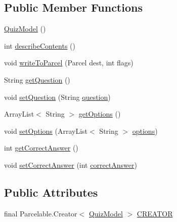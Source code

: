 \subsection*{Public Member Functions}
\begin{DoxyCompactItemize}
\item 
\hyperlink{classorg_1_1buildmlearn_1_1quiztime_1_1data_1_1QuizModel_a6edd6fc87ecca733758244af765476c4}{Quiz\+Model} ()
\item 
int \hyperlink{classorg_1_1buildmlearn_1_1quiztime_1_1data_1_1QuizModel_a096de5851958330cbb3ad03fe7a5cc18}{describe\+Contents} ()
\item 
void \hyperlink{classorg_1_1buildmlearn_1_1quiztime_1_1data_1_1QuizModel_ad6382aa8376dbde55531e6a0a274eb74}{write\+To\+Parcel} (Parcel dest, int flags)
\item 
String \hyperlink{classorg_1_1buildmlearn_1_1quiztime_1_1data_1_1QuizModel_abba335db2d409549f41d10bbd05a8bab}{get\+Question} ()
\item 
void \hyperlink{classorg_1_1buildmlearn_1_1quiztime_1_1data_1_1QuizModel_a07aefd1723f5bf604fc024e9b2983e45}{set\+Question} (String \hyperlink{classorg_1_1buildmlearn_1_1quiztime_1_1data_1_1QuizModel_a766d7c74280ac9f78f0ef37b81a98992}{question})
\item 
Array\+List$<$ String $>$ \hyperlink{classorg_1_1buildmlearn_1_1quiztime_1_1data_1_1QuizModel_ae4dad0dfeb2020e9f8827542fd625c07}{get\+Options} ()
\item 
void \hyperlink{classorg_1_1buildmlearn_1_1quiztime_1_1data_1_1QuizModel_aba75fdb5e643146b136d72f0a8113d1c}{set\+Options} (Array\+List$<$ String $>$ \hyperlink{classorg_1_1buildmlearn_1_1quiztime_1_1data_1_1QuizModel_a1bc4a9ea2622409109f2b6b48080d31c}{options})
\item 
int \hyperlink{classorg_1_1buildmlearn_1_1quiztime_1_1data_1_1QuizModel_ae01ec7b523f46ffcbfce7439f1f714b0}{get\+Correct\+Answer} ()
\item 
void \hyperlink{classorg_1_1buildmlearn_1_1quiztime_1_1data_1_1QuizModel_acee1d3fe01cabd54c5717b229f40ae93}{set\+Correct\+Answer} (int \hyperlink{classorg_1_1buildmlearn_1_1quiztime_1_1data_1_1QuizModel_ad061f6ad5ac348ef167a366c95d707e9}{correct\+Answer})
\end{DoxyCompactItemize}
\subsection*{Public Attributes}
\begin{DoxyCompactItemize}
\item 
final Parcelable.\+Creator$<$ \hyperlink{classorg_1_1buildmlearn_1_1quiztime_1_1data_1_1QuizModel}{Quiz\+Model} $>$ \hyperlink{classorg_1_1buildmlearn_1_1quiztime_1_1data_1_1QuizModel_ac4e21d36758e65d378176b71be2811f3}{C\+R\+E\+A\+T\+OR}
\end{DoxyCompactItemize}
